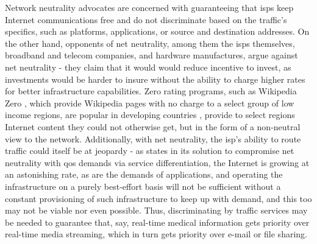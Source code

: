     Network neutrality advocates are concerned with guaranteeing that \glspl{isp} keep Internet communications free and do not discriminate based on the traffic's specifics, such as platforms, applications, or source and destination addresses.
    On the other hand, opponents of net neutrality, among them the \glspl{isp} themselves, broadband and telecom companies, and hardware manufactures, argue against net neutrality - they claim that it would would reduce incentive to invest, as investments would be harder to insure without the ability to charge higher rates for better infrastructure capabilities.
    Zero rating programs, such as Wikipedia Zero \cite{wikipedia-zero}, which provide Wikipedia \cite{wikipedia} pages with no charge to a select group of low income regions, are popular in developing countries \cite{network-neutrality-developing} , provide to select regions Internet content they could not otherwise get, but in the form of a non-neutral view to the network.
    Additionally, with net neutrality, the \gls{isp}'s ability to route traffic could itself be at jeopardy - as \cite{qos-aware} states in its solution to compromise net neutrality with \gls{qos} demands via service differentiation, the Internet is growing at an astonishing rate, as are the demands of applications, and operating the infrastructure on a purely best-effort basis will not be sufficient without a constant provisioning of such infrastructure to keep up with demand, and this too may not be viable nor even possible.
    Thus, discriminating by traffic services may be needed to guarantee that, say, real-time medical information gets priority over real-time media streaming, which in turn gets priority over e-mail or file sharing.

